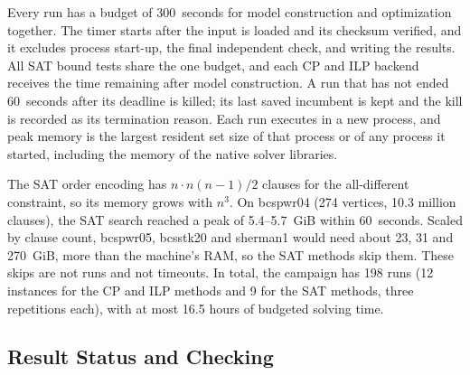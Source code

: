 Every run has a budget of 300~seconds for model construction and optimization together. The timer starts after the input is loaded and its checksum verified, and it excludes process start-up, the final independent check, and writing the results. All SAT bound tests share the one budget, and each CP and ILP backend receives the time remaining after model construction. A run that has not ended 60~seconds after its deadline is killed; its last saved incumbent is kept and the kill is recorded as its termination reason. Each run executes in a new process, and peak memory is the largest resident set size of that process or of any process it started, including the memory of the native solver libraries.

The SAT order encoding has $n \cdot n(n-1)/2$ clauses for the all-different constraint, so its memory grows with $n^3$. On bcspwr04 (274 vertices, 10.3 million clauses), the SAT search reached a peak of 5.4--5.7~GiB within 60~seconds. Scaled by clause count, bcspwr05, bcsstk20 and sherman1 would need about 23, 31 and 270~GiB, more than the machine's RAM, so the SAT methods skip them. These skips are not runs and not timeouts. In total, the campaign has 198 runs (12 instances for the CP and ILP methods and 9 for the SAT methods, three repetitions each), with at most 16.5 hours of budgeted solving time.

\subsection{Result Status and Checking}\label{sec:setup-status}

